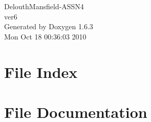 \documentclass[a4paper]{book}
\begin{document}
\hypersetup{pageanchor=false}
\begin{titlepage}
\vspace*{7cm}
\begin{center}
{\Large DelouthMansfield-\/ASSN4 \\[1ex]\large ver6 }\\
\vspace*{1cm}
{\large Generated by Doxygen 1.6.3}\\
\vspace*{0.5cm}
{\small Mon Oct 18 00:36:03 2010}\\
\end{center}
\end{titlepage}
\clearemptydoublepage
{}
\tableofcontents
\clearemptydoublepage
{}
\hypersetup{pageanchor=true}
\chapter{File Index}

\chapter{File Documentation}





\printindex
\end{document}
